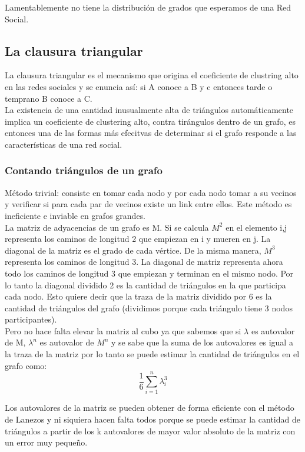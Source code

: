 \documentclass[titlepage,a4paper]{article}
\begin{document}
Lamentablemente no tiene la distribución de grados que esperamos de una Red Social. 

\subsection*{La clausura triangular}
La clausura triangular es el mecanismo que origina el coeficiente de clustring alto en las redes sociales y se enuncia así: si A conoce a B y c entonces tarde o temprano B conoce a C. \\

La existencia de una cantidad inusualmente alta de triángulos automáticamente implica un coeficiente de clustering alto, contra tirángulos dentro de un grafo, es entonces una de las formas más efecitvas de determinar si el grafo responde a las características de una red social. 

\subsubsection*{Contando triángulos de un grafo}
Método trivial: consiste en tomar cada nodo y por cada nodo tomar a su vecinos y verificar si para cada par de vecinos existe un link entre ellos. Este método es ineficiente e inviable en grafos grandes. \\

La matriz de adyacencias de un grafo es M. Si se calcula $M^2$ en el elemento i,j representa los caminos de longitud 2 que empiezan en i y mueren en j. La diagonal de la matriz es el grado de cada vértice. De la misma manera, $M^3$representa los caminos de longitud 3. La diagonal de matriz representa ahora todo los caminos de longitud 3 que empiezan y terminan en el mismo nodo. Por lo tanto la diagonal dividido 2 es la cantidad de triángulos en la que participa cada nodo. Esto quiere decir que la traza de la matriz dividido por 6 es la cantidad de triángulos del grafo (dividimos porque cada triángulo tiene 3 nodos participantes). \\

Pero no hace falta elevar la matriz al cubo ya que sabemos que si $\lambda$ es autovalor de M, $\lambda^n$ es autovalor de $M^n$ y se sabe que la suma de los autovalores es igual a la traza de la matriz por lo tanto se puede estimar la cantidad de triángulos en el grafo como: $$\frac{1}{6} \sum_{i=1}^n \lambda_i^3$$

Los autovalores de la matriz se pueden obtener de forma eficiente con el método de Lanezos y ni siquiera hacen falta todos porque se puede estimar la cantidad de triángulos a partir de los k autovalores de mayor valor absoluto de la matriz con un error muy pequeño. \\
\end{document}
